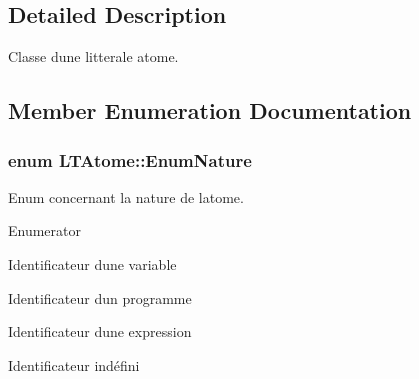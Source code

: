 \subsection{Detailed Description}
Classe d\textquotesingle{}une litterale atome. 

\subsection{Member Enumeration Documentation}
\subsubsection[{\texorpdfstring{Enum\+Nature}{EnumNature}}]{\setlength{\rightskip}{0pt plus 5cm}enum {\bf L\+T\+Atome\+::\+Enum\+Nature}}\hypertarget{class_l_t_atome_a340480fc682a6d8fd819026d20278b49}{}\label{class_l_t_atome_a340480fc682a6d8fd819026d20278b49}


Enum concernant la nature de l\textquotesingle{}atome. 

\begin{Desc}
\item[Enumerator]\par
\begin{description}
\item[{\em 
I\+D\+V\+AR\hypertarget{class_l_t_atome_a340480fc682a6d8fd819026d20278b49a99911d63d6cb7a762dfeec132628ff22}{}\label{class_l_t_atome_a340480fc682a6d8fd819026d20278b49a99911d63d6cb7a762dfeec132628ff22}
}]Identificateur d\textquotesingle{}une variable \item[{\em 
I\+D\+P\+R\+OG\hypertarget{class_l_t_atome_a340480fc682a6d8fd819026d20278b49a56cc525550a6a682752d67bd704f834a}{}\label{class_l_t_atome_a340480fc682a6d8fd819026d20278b49a56cc525550a6a682752d67bd704f834a}
}]Identificateur d\textquotesingle{}un programme \item[{\em 
I\+D\+E\+XP\hypertarget{class_l_t_atome_a340480fc682a6d8fd819026d20278b49a192a6fae9192e3a133b23f9939bcebd3}{}\label{class_l_t_atome_a340480fc682a6d8fd819026d20278b49a192a6fae9192e3a133b23f9939bcebd3}
}]Identificateur d\textquotesingle{}une expression \item[{\em 
I\+N\+D\+E\+F\+I\+NI\hypertarget{class_l_t_atome_a340480fc682a6d8fd819026d20278b49a841226cd2ef78fa4c11c33180b05103e}{}\label{class_l_t_atome_a340480fc682a6d8fd819026d20278b49a841226cd2ef78fa4c11c33180b05103e}
}]Identificateur indéfini \end{description}
\end{Desc}


